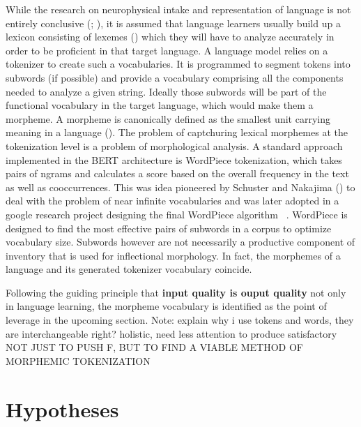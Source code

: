 While the research on neurophysical intake and representation of language is not entirely conclusive (\textcite[1--3]{n400}; \textcite{L2morphology}), it is assumed that language learners usually build up a lexicon consisting of lexemes (\cite[82 -- 100]{brennan2022language}) which they will have to analyze accurately in order to be proficient in that target language.
A language model relies on a tokenizer to create such a vocabularies.
It is programmed to segment tokens into subwords (if possible) and provide a vocabulary comprising all the components needed to analyze a given string.
Ideally those subwords will be part of the functional vocabulary in the target language, which would make them a morpheme.
A morpheme is canonically defined as the smallest unit carrying meaning in a language (\cite{morpheme}).
The problem of captchuring lexical morphemes at the tokenization level is a problem of morphological analysis.
A standard approach implemented in the BERT architecture is WordPiece tokenization, which takes pairs of ngrams and calculates a score based on the overall frequency in the text as well as cooccurrences.
This was idea pioneered by Schuster and Nakajima (\citeyear{WORDPIECEOG}) to deal with the problem of near infinite vocabularies and was later adopted in a google research project designing the final WordPiece algorithm ~\cite{WORDPIECEGOOGLE}.
WordPiece is designed to find the most effective pairs of subwords in a corpus to optimize vocabulary size.
Subwords however are not necessarily a productive component of inventory that is used for inflectional morphology.
In fact, the morphemes of a language and its generated tokenizer vocabulary  coincide.

\cite{FLOTA}

Following the guiding principle that \textbf{input quality is ouput quality} not only in language learning, the morpheme vocabulary is identified as the point of leverage in the upcoming section.
Note: explain why i use tokens and words, they are interchangeable right?
holistic, need less attention to produce satisfactory
\uppercase{not just to push F, but to find a viable method of morphemic tokenization}


\section{Hypotheses}
\label{sec:hypothesis}

